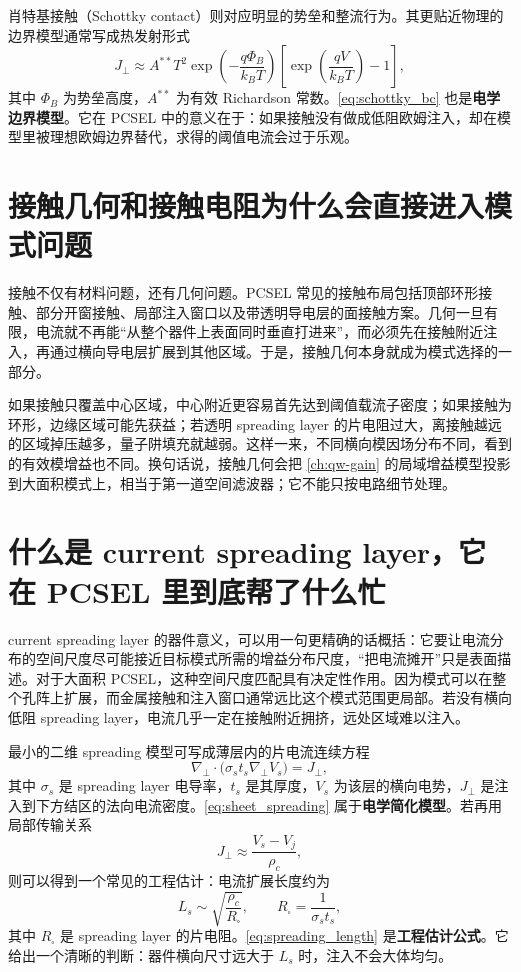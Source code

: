 肖特基接触（Schottky contact）则对应明显的势垒和整流行为。其更贴近物理的边界模型通常写成热发射形式
\begin{equation}
J_\perp \approx A^{\ast\ast}T^2
\exp\!\left(-\frac{q\Phi_B}{k_B T}\right)
\left[\exp\!\left(\frac{qV}{k_B T}\right)-1\right],
\label{eq:schottky_bc}
\end{equation}
其中 $\Phi_B$ 为势垒高度，$A^{\ast\ast}$ 为有效 Richardson 常数。\cref{eq:schottky_bc} 也是\textbf{电学边界模型}。它在 PCSEL 中的意义在于：如果接触没有做成低阻欧姆注入，却在模型里被理想欧姆边界替代，求得的阈值电流会过于乐观。

\section{接触几何和接触电阻为什么会直接进入模式问题}
接触不仅有材料问题，还有几何问题。PCSEL 常见的接触布局包括顶部环形接触、部分开窗接触、局部注入窗口以及带透明导电层的面接触方案。几何一旦有限，电流就不再能“从整个器件上表面同时垂直打进来”，而必须先在接触附近注入，再通过横向导电层扩展到其他区域。于是，接触几何本身就成为模式选择的一部分。

如果接触只覆盖中心区域，中心附近更容易首先达到阈值载流子密度；如果接触为环形，边缘区域可能先获益；若透明 spreading layer 的片电阻过大，离接触越远的区域掉压越多，量子阱填充就越弱。这样一来，不同横向模因场分布不同，看到的有效模增益也不同。换句话说，接触几何会把 \cref{ch:qw-gain} 的局域增益模型投影到大面积模式上，相当于第一道空间滤波器；它不能只按电路细节处理。

\section[Current Spreading Layer]{什么是 current spreading layer，它在 PCSEL 里到底帮了什么忙}
current spreading layer 的器件意义，可以用一句更精确的话概括：它要让电流分布的空间尺度尽可能接近目标模式所需的增益分布尺度，“把电流摊开”只是表面描述。对于大面积 PCSEL，这种空间尺度匹配具有决定性作用。因为模式可以在整个孔阵上扩展，而金属接触和注入窗口通常远比这个模式范围更局部。若没有横向低阻 spreading layer，电流几乎一定在接触附近拥挤，远处区域难以注入。

最小的二维 spreading 模型可写成薄层内的片电流连续方程
\begin{equation}
\nabla_{\perp}\cdot\big(\sigma_s t_s \nabla_{\perp} V_s\big) = J_{\perp},
\label{eq:sheet_spreading}
\end{equation}
其中 $\sigma_s$ 是 spreading layer 电导率，$t_s$ 是其厚度，$V_s$ 为该层的横向电势，$J_{\perp}$ 是注入到下方结区的法向电流密度。\cref{eq:sheet_spreading} 属于\textbf{电学简化模型}。若再用局部传输关系
\begin{equation}
J_{\perp} \approx \frac{V_s - V_j}{\rho_c},
\label{eq:vertical_transfer}
\end{equation}
则可以得到一个常见的工程估计：电流扩展长度约为
\begin{equation}
L_s \sim \sqrt{\frac{\rho_c}{R_{\square}}},
\qquad
R_{\square}=\frac{1}{\sigma_s t_s},
\label{eq:spreading_length}
\end{equation}
其中 $R_{\square}$ 是 spreading layer 的片电阻。\cref{eq:spreading_length} 是\textbf{工程估计公式}。它给出一个清晰的判断：器件横向尺寸远大于 $L_s$ 时，注入不会大体均匀。

